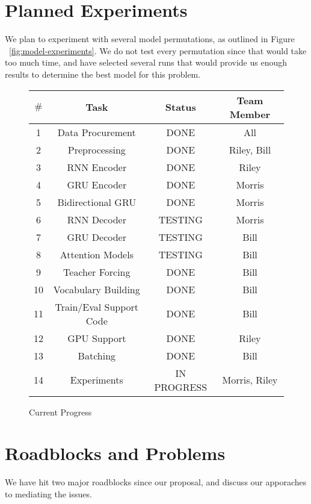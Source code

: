 \documentclass[twoside,twocolumn]{article}
\begin{document}
\section{Planned Experiments}
We plan to experiment with several model permutations, as outlined in Figure
~\ref{fig:model-experiments}. We do not test every permutation since that would
take too much time, and have selected several runs that would provide us enough
results to determine the best model for this problem.

\begin{figure*}[ht]
    \centering
    \begin{tabular}{ |c|c|c|c| }
        \hline
        $\#$
          & \textbf{Task}
          & \textbf{Status}
          & \textbf{Team Member}\\
        \hline
        1 & Data Procurement & DONE & All \\ \hline
        2 & Preprocessing & DONE & Riley, Bill \\ \hline
        3 & RNN Encoder & DONE & Riley \\ \hline
        4 & GRU Encoder & DONE & Morris \\ \hline
        5 & Bidirectional GRU & DONE & Morris \\ \hline
        6 & RNN Decoder & TESTING & Morris \\ \hline
        7 & GRU Decoder & TESTING & Bill \\ \hline
        8 & Attention Models & TESTING & Bill \\ \hline
        9 & Teacher Forcing & DONE & Bill \\ \hline
        10 & Vocabulary Building & DONE & Bill \\ \hline
        11 & Train/Eval Support Code & DONE & Bill \\ \hline
        12 & GPU Support & DONE & Riley \\ \hline
        13 & Batching & DONE & Bill \\ \hline
        14 & Experiments & IN PROGRESS & Morris, Riley \\ \hline
    \end{tabular}

    \caption{Current Progress}
    \label{fig:current-status}
\end{figure*}


\section{Roadblocks and Problems}
We have hit two major roadblocks since our proposal, and discuss our apporaches
to mediating the issues.
\end{document}
